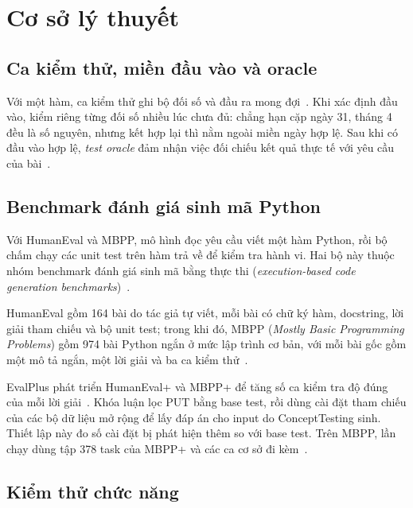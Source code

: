 \chapter{Cơ sở lý thuyết}
\label{chap:background}

\section{Ca kiểm thử, miền đầu vào và oracle}
\label{sec:testing-concepts}

Với một hàm, ca kiểm thử ghi bộ đối số và đầu ra mong đợi~\cite[tr.~7--8]{pham2014kiemthu}. Khi xác định đầu vào, kiểm riêng từng đối số nhiều lúc chưa đủ: chẳng hạn cặp ngày 31, tháng 4 đều là số nguyên, nhưng kết hợp lại thì nằm ngoài miền ngày hợp lệ. Sau khi có đầu vào hợp lệ, \textit{test oracle} đảm nhận việc đối chiếu kết quả thực tế với yêu cầu của bài~\cite{istqb2024}.

\section{Benchmark đánh giá sinh mã Python}
\label{sec:code-benchmarks}

Với HumanEval và MBPP, mô hình đọc yêu cầu viết một hàm Python, rồi bộ chấm chạy các unit test trên hàm trả về để kiểm tra hành vi. Hai bộ này thuộc nhóm benchmark đánh giá sinh mã bằng thực thi (\textit{execution-based code generation benchmarks})~\cite{chen2021evaluating,austin2021program}.

HumanEval gồm 164 bài do tác giả tự viết, mỗi bài có chữ ký hàm, docstring, lời giải tham chiếu và bộ unit test; trong khi đó, MBPP (\textit{Mostly Basic Programming Problems}) gồm 974 bài Python ngắn ở mức lập trình cơ bản, với mỗi bài gốc gồm một mô tả ngắn, một lời giải và ba ca kiểm thử~\cite{chen2021evaluating,austin2021program}.

EvalPlus phát triển HumanEval+ và MBPP+ để tăng số ca kiểm tra độ đúng của mỗi lời giải~\cite{liu2023evalplus,evalplusMbppDataset}. Khóa luận lọc PUT bằng base test, rồi dùng cài đặt tham chiếu của các bộ dữ liệu mở rộng để lấy đáp án cho input do ConceptTesting sinh. Thiết lập này đo số cài đặt bị phát hiện thêm so với base test. Trên MBPP, lần chạy dùng tập 378 task của MBPP+ và các ca cơ sở đi kèm~\cite{mbppplusRelease}.

\section{Kiểm thử chức năng}
\label{sec:functional-techniques}

